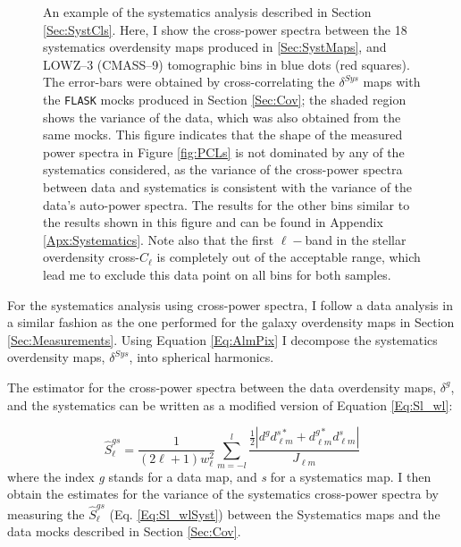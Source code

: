 \begin{figure}
\begin{center}
\caption[An example of the systematics analysis for the BOSS samples.]{An example of the systematics analysis described in Section \ref{Sec:SystCls}. Here, I show the cross-power spectra between the 18 systematics overdensity maps produced in \ref{Sec:SystMaps}, and LOWZ--3 (CMASS--9) tomographic bins in blue dots (red squares). The error-bars were obtained by cross-correlating the $\delta^{Sys}$ maps with the \texttt{FLASK} mocks produced in Section \ref{Sec:Cov}; the shaded region shows the variance of the data, which was also obtained from the same mocks. This figure indicates that the shape of the measured power spectra in Figure \ref{fig:PCLs} is not dominated by any of the systematics considered, as the variance of the cross-power spectra between data and systematics is consistent with the variance of the data's auto-power spectra. The results for the other bins similar to the results shown in this figure and can be found in Appendix \ref{Apx:Systematics}. Note also that the first $\ell-$band in the stellar overdensity cross-$C_{\ell}$ is completely out of the acceptable range, which lead me to exclude this data point on all bins for both samples.}
\label{fig:SystBin3}
\end{center}
\end{figure}
For the systematics analysis using cross-power spectra, I follow a data analysis in a similar fashion as the one performed for the galaxy overdensity maps in Section \ref{Sec:Measurements}.  Using Equation \eqref{Eq:AlmPix} I decompose the systematics overdensity maps, $\delta^{Sys}$, into spherical harmonics. 

The estimator for the cross-power spectra between the data overdensity maps, $\delta^{g}$, and the systematics can be written as a modified version of Equation \eqref{Eq:Sl_wl}:

\begin{equation}
\hat{S}^{gs}_{\ell} = \frac{1}{(2\ell+1)w_{\ell}^2}\sum_{m=-l}^l  \frac{\frac{1}{2}\left|d_{}^{g}  d_{\ell m}^{s*} + d_{\ell m}^{g*}  d_{\ell m}^{s}\right|}{J_{\ell m}}
\label{Eq:Sl_wlSyst}
\end{equation}
where the index \textit{g} stands for a data map, and \textit{s} for a systematics map. I then obtain the estimates for the variance of the systematics cross-power spectra by measuring the $\hat{S}^{gs}_{\ell}$ (Eq. \eqref{Eq:Sl_wlSyst}) between the Systematics maps and the data mocks described in Section \ref{Sec:Cov}.

